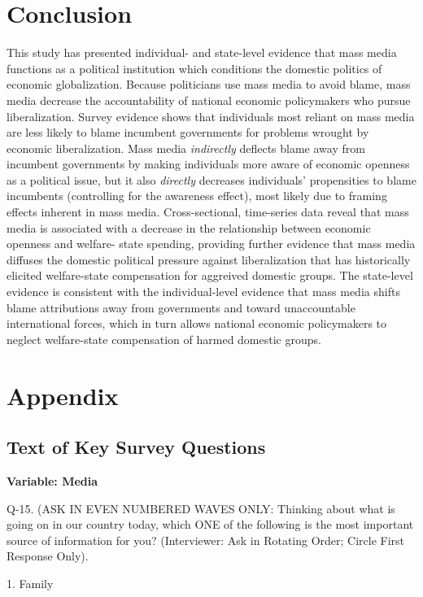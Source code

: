 \documentclass[12pt]{report}
\begin{document}
\section{Conclusion}

This study has presented individual- and state-level evidence that mass media functions as a
political institution which conditions the domestic politics of economic globalization. Because
politicians use mass media to avoid blame, mass media decrease the accountability of national
economic policymakers who pursue liberalization. Survey evidence shows that individuals most reliant
on mass media are less likely to blame incumbent governments for problems wrought by economic
liberalization. Mass media \emph{indirectly} deflects blame away from incumbent governments by
making individuals more aware of economic openness as a political issue, but it also \emph{directly}
decreases individuals' propensities to blame incumbents (controlling for the awareness effect), most
likely due to framing effects inherent in mass media. Cross-sectional, time-series data reveal that
mass media is associated with a decrease in the relationship between economic openness and welfare-
state spending, providing further evidence that mass media diffuses the domestic political pressure
against liberalization that has historically elicited welfare-state compensation for aggreived
domestic groups. The state-level evidence is consistent with the individual-level evidence that mass
media shifts blame attributions away from governments and toward unaccountable international forces,
which in turn allows national economic policymakers to neglect welfare-state compensation of harmed
domestic groups.

\section{Appendix}

\subsection*{Text of Key Survey Questions}

\noindent \textbf{Variable: Media}

\noindent Q-15. (ASK IN EVEN NUMBERED WAVES ONLY: Thinking about what
is going on in our country today, which ONE of the following is the
most important source of information for you? (Interviewer: Ask in
Rotating Order; Circle First Response Only).

1. Family
\end{document}
